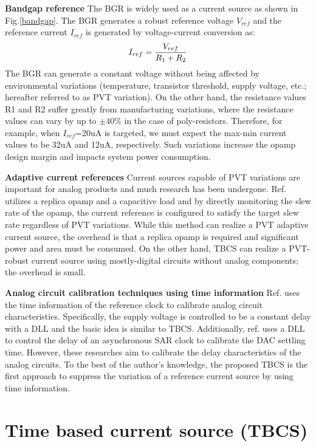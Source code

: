\documentclass[letterpaper, 10 pt, conference]{ieeeconf}  %
\begin{document}
\textbf{Bandgap reference} The BGR is widely used as a current source as shown in Fig.\ref{bandgap}. The BGR generates a robust reference voltage $V_{ref}$ and the reference current $I_{ref}$ is generated by voltage-current conversion as:
\begin{eqnarray}
    \centering
    I_{ref} = \frac{V_{ref}}{R_1 + R_2}
    \label{sar13b}
\end{eqnarray}
The BGR can generate a constant voltage without being affected by environmental variations (temperature, transistor threshold, supply voltage, etc.; hereafter referred to as PVT variation). On the other hand, the resistance values R1 and R2 suffer greatly from manufacturing variations, where the resistance values can vary by up to $\pm 40\%$ in the case of poly-resistors. Therefore, for example, when $I_{ref}$=20uA is targeted, we must expect the max-min current values to be 32uA and 12uA, respectively. Such variations increase the opamp design margin and impacts system power consumption.

\textbf{Adaptive current references} Current sources capable of PVT variations are important for analog products and much research has been undergone. Ref.\cite{chuanyang,ron} utilizes a replica opamp and a capacitive load and by directly monitoring the slew rate of the opamp, the current reference is configured to satisfy the target slew rate regardless of PVT variations.
While this method can realize a PVT adaptive current source, the overhead is that a replica opamp is required and significant power and area must be consumed. On the other hand, TBCS can realize a PVT-robust current source using mostly-digital circuits without analog components; the overhead is small.

\textbf{Analog circuit calibration techniques using time information} Ref.\cite{zhu} uses the time information of the reference clock to calibrate analog circuit characteristics. Specifically, the supply voltage is controlled to be a constant delay with a DLL and the basic idea is similar to TBCS. Additionally, ref.\cite{kapusta201314b,tomson} uses a DLL to control the delay of an asynchronous SAR clock to calibrate the DAC settling time.
However, these researches aim to calibrate the delay characteristics of the analog circuits. To the best of the author's knowledge, the proposed TBCS is the first approach to suppress the variation of a reference current source by using time information.

\section{Time based current source (TBCS)}
\end{document}
